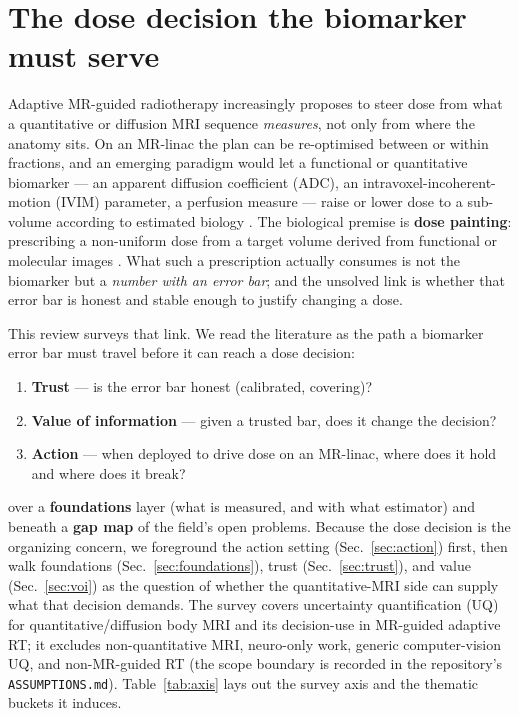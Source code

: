 \documentclass[review,number]{elsarticle}
\begin{document}
\section{The dose decision the biomarker must serve}
\label{sec:scope}

Adaptive MR-guided radiotherapy increasingly proposes to steer dose from what a
quantitative or diffusion MRI sequence \emph{measures}, not only from where the anatomy
sits. On an MR-linac the plan can be re-optimised between or within fractions, and an
emerging paradigm would let a functional or quantitative biomarker --- an apparent
diffusion coefficient (ADC), an intravoxel-incoherent-motion (IVIM) parameter, a
perfusion measure --- raise or lower dose to a sub-volume according to estimated biology
\cite{otazo2021,hall2022}. The biological premise is \textbf{dose painting}: prescribing
a non-uniform dose from a target volume derived from functional or molecular images
\cite{ling2000,bentzen2005,bentzen2011}. What such a prescription actually consumes is
not the biomarker but a \emph{number with an error bar}; and the unsolved link is whether
that error bar is honest and stable enough to justify changing a dose.

This review surveys that link. We read the literature as the path a biomarker error bar
must travel before it can reach a dose decision:

\begin{enumerate}
  \item \textbf{Trust} --- is the error bar honest (calibrated, covering)?
  \item \textbf{Value of information} --- given a trusted bar, does it change the decision?
  \item \textbf{Action} --- when deployed to drive dose on an MR-linac, where does it hold and where does it break?
\end{enumerate}

\noindent over a \textbf{foundations} layer (what is measured, and with what estimator)
and beneath a \textbf{gap map} of the field's open problems. Because the dose decision is
the organizing concern, we foreground the action setting
(Sec.~\ref{sec:action}) first, then walk foundations
(Sec.~\ref{sec:foundations}), trust (Sec.~\ref{sec:trust}), and value
(Sec.~\ref{sec:voi}) as the question of whether the quantitative-MRI side can supply what
that decision demands. The survey covers uncertainty quantification (UQ) for
quantitative/diffusion body MRI and its decision-use in MR-guided adaptive RT; it
excludes non-quantitative MRI, neuro-only work, generic computer-vision UQ, and
non-MR-guided RT (the scope boundary is recorded in the repository's
\texttt{ASSUMPTIONS.md}). Table~\ref{tab:axis} lays out the survey axis and the thematic
buckets it induces.
\end{document}
